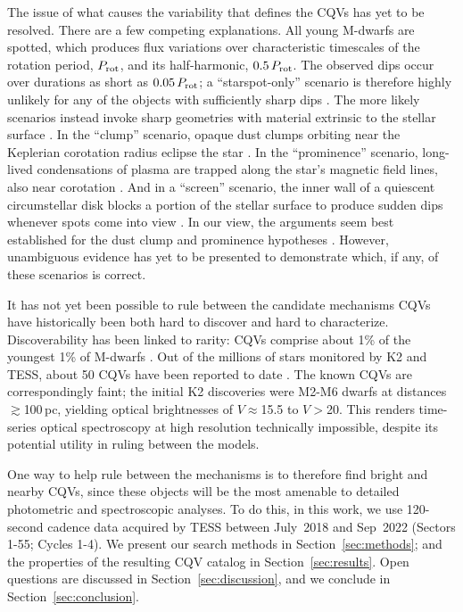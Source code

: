\documentclass[11pt,twocolumn,tighten]{aastex63}
\begin{document}
The issue of what causes the variability that defines the CQVs has yet
to be resolved.  There are a few competing explanations.  All young
M-dwarfs are spotted, which produces flux variations over
characteristic timescales of the rotation period, $P_{\rm rot}$, and
its half-harmonic, $0.5\,P_{\rm rot}$.  The observed dips occur over
durations as short as $0.05\,P_{\rm rot}$; a ``starspot-only''
scenario is therefore highly unlikely for any of the objects with
sufficiently sharp dips
\citep{2017AJ....153..152S,2021MNRAS.500.1366K}.   The more likely
scenarios instead invoke sharp geometries with material extrinsic to
the stellar surface
\citep[e.g.][]{2017AJ....153..152S,2022AJ....163..144G}.  In the
``clump'' scenario, opaque dust clumps orbiting near the Keplerian
corotation radius eclipse the star
\citep{2017AJ....153..152S,2023MNRAS.518.4734S}.  In the
``prominence'' scenario, long-lived condensations of plasma are
trapped along the star’s magnetic field lines, also near corotation
\citep{2022MNRAS.514.5465W}.  And in a ``screen'' scenario, the inner
wall of a quiescent circumstellar disk blocks a portion of the stellar
surface to produce sudden dips whenever spots come into view
\citep{2019ApJ...876..127Z}.  In our view, the arguments seem best
established for the dust clump and prominence hypotheses
\citep{2023MNRAS.518.4734S,2022MNRAS.514.5465W}.  However, unambiguous
evidence has yet to be presented to demonstrate which, if any, of
these scenarios is correct.

It has not yet been possible to rule between the candidate mechanisms
CQVs have historically been both hard to discover and hard to
characterize.   Discoverability has been linked to rarity: CQVs
comprise about 1\% of the youngest 1\% of M-dwarfs
\citep{2018AJ....155..196R}.  Out of the millions of stars monitored
by K2 and TESS, about 50 CQVs have been reported to date
\citep{2016AJ....152..114R,2017AJ....153..152S,2018AJ....155...63S,2019ApJ...876..127Z,2020AJ....160...86B,2022AJ....163..144G,2023ApJ...945..114P}.
The known CQVs are correspondingly faint; the initial K2 discoveries
\citep{2016AJ....152..114R,2017AJ....153..152S} were M2-M6 dwarfs at distances
$\gtrsim$100\,pc, yielding optical brightnesses of $V$$\approx$15.5 to
$V$$>$20.  This renders time-series optical spectroscopy at high
resolution technically impossible, despite its potential utility in
ruling between the models.

One way to help rule between the mechanisms is to therefore find
bright and nearby CQVs, since these objects will be the most amenable
to detailed photometric and spectroscopic analyses.  To do this, in
this work, we use 120-second cadence data acquired by TESS between
July~2018 and Sep~2022 (Sectors 1-55; Cycles 1-4).  We present our
search methods in Section~\ref{sec:methods}; and the properties of the
resulting CQV catalog in Section~\ref{sec:results}.  Open questions
are discussed in Section~\ref{sec:discussion}, and we conclude in
Section~\ref{sec:conclusion}.
\end{document}
